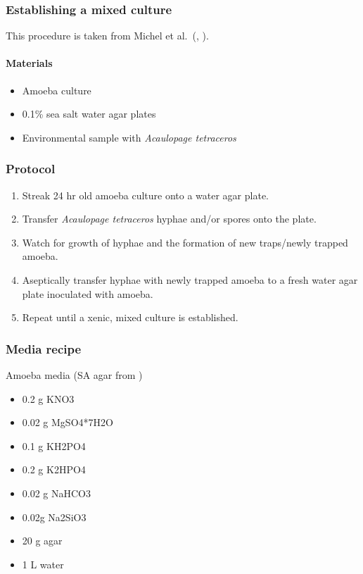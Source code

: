 \documentclass[]{book}
\providecommand{\tightlist}{%
  \setlength{\itemsep}{0pt}\setlength{\parskip}{0pt}}
\let\oldparagraph\paragraph
\renewcommand{\paragraph}[1]{\oldparagraph{#1}\mbox{}}
\begin{document}
\hypertarget{establishing-a-mixed-culture}{%
\subsubsection{Establishing a mixed culture}\label{establishing-a-mixed-culture}}

This procedure is taken from Michel et al.~(\citeyearpar{Michel_2014}, \citeyearpar{Michel_2015}).

\hypertarget{materials-1}{%
\paragraph{Materials}\label{materials-1}}

\begin{itemize}
\tightlist
\item
  Amoeba culture
\item
  0.1\% sea salt water agar plates
\item
  Environmental sample with \emph{Acaulopage tetraceros}
\end{itemize}

\hypertarget{protocol}{%
\subsubsection{Protocol}\label{protocol}}

\begin{enumerate}
\def\labelenumi{\arabic{enumi}.}
\tightlist
\item
  Streak 24 hr old amoeba culture onto a water agar plate.
\item
  Transfer \emph{Acaulopage tetraceros} hyphae and/or spores onto the plate.
\item
  Watch for growth of hyphae and the formation of new traps/newly trapped amoeba.
\item
  Aseptically transfer hyphae with newly trapped amoeba to a fresh water agar plate inoculated with amoeba.
\item
  Repeat until a xenic, mixed culture is established.
\end{enumerate}

\hypertarget{media-recipe}{%
\subsubsection{Media recipe}\label{media-recipe}}

{Amoeba media (SA agar from \citet{Saikawa_2002})}

\begin{itemize}
\tightlist
\item
  0.2 g KNO3
\item
  0.02 g MgSO4*7H2O
\item
  0.1 g KH2PO4
\item
  0.2 g K2HPO4
\item
  0.02 g NaHCO3
\item
  0.02g Na2SiO3
\item
  20 g agar
\item
  1 L water
\end{itemize}
\end{document}
